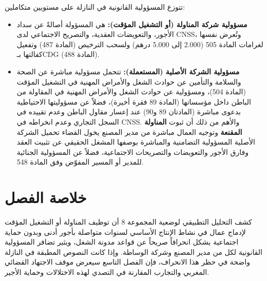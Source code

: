 \vspace{0.25cm}\par\smallskip
تتوزع المسؤولية القانونية في النازلة على مستويين متكاملين:
\begin{itemize}[leftmargin=*, itemsep=4pt]
    \item \textbf{مسؤولية شركة المناولة (أو التشغيل المؤقت):} هي المسؤولة أصالةً عن سداد الأجور، والتعويضات العقدية، والتصريح الاجتماعي لدى \textenglish{CNSS}، وتُعرض نفسها لغرامات المادة \textenglish{505} (\textenglish{2.000} إلى \textenglish{5.000} درهم) ولسحب الترخيص (المادة \textenglish{487}) وتفعيل كفالتها بـ\textenglish{CDG} (المادة \textenglish{488}).
    \item \textbf{مسؤولية الشركة الأصلية (المستعملة):} تتحمل مسؤولية مباشرة عن الصحة والسلامة والتأمين عن حوادث الشغل والأمراض المهنية في التشغيل المؤقت (المادة \textenglish{504})، ومسؤولية عن حوادث الشغل والأمراض المهنية في المقاولة من الباطن داخل مؤسساتها (المادة \textenglish{89} فقرة أخيرة)، فضلاً عن مسؤوليتها الاحتياطية بدعوى مباشرة (المادتان \textenglish{89} و\textenglish{90}) عند إعسار مقاول الباطن وعدم تقييده في السجل التجاري وعدم انخراطه في \textenglish{CNSS}. والأهم من ذلك أن ثبوت \textbf{المناولة المقنعة} وتوجيه العمال مباشرة من مدير المصنع يخول القضاء تحميل الشركة الأصلية المسؤولية التضامنية والمباشرة بوصفها المشغل الحقيقي عن تثبيت العقد وفارق الأجور والتعويضات والتصريحات الاجتماعية، فضلاً عن المسؤولية الجنائية للمدير أو المسير المفوّض وفق المادة \textenglish{548}.
\end{itemize}

\section*{خلاصة الفصل}

كشف التحليل التطبيقي لوضعية المجموعة \textenglish{8} أن توظيف المناولة أو التشغيل المؤقت لإدماج عمال في نشاط الإنتاج الأساسي لسنوات متواصلة بأجور أدنى وبدون حماية اجتماعية يشكل انحرافاً صريحاً عن قواعد مدونة الشغل، ويثير تضافر المسؤولية القانونية لكل من مدير المصنع وشركة الوساطة. وإذا كانت النصوص المطبقة في النازلة واضحة في حظر هذا الانحراف، فإن الفصل التاسع سيعرض موقف الاجتهاد القضائي المغربي والتجارب المقارنة في التصدي لهذه الاختلالات وحماية الأجير.
